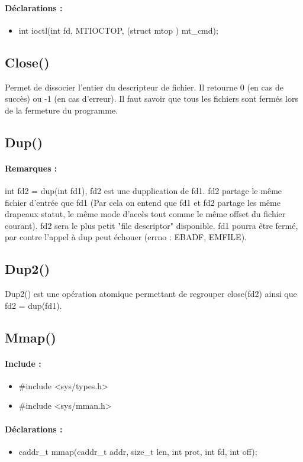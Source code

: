 \documentclass{article}[12pt]
\begin{document}
\paragraph{Déclarations : }
\begin{itemize}
	\item int ioctl(int fd, MTIOCTOP, (struct mtop \*) mt\_cmd);
\end{itemize}
\subsection{Close()}
Permet de dissocier l'entier du descripteur de fichier. Il retourne 0 (en cas de succès) ou -1 (en cas d'erreur). Il faut savoir que tous les fichiers sont fermés lors de la fermeture du programme.
\subsection{Dup()}
\paragraph{Remarques : } int fd2 = dup(int fd1), fd2 est une dupplication de fd1. fd2 partage le même fichier d'entrée que fd1 (Par cela on entend que fd1 et fd2 partage les même drapeaux statut, le même mode d'accès tout comme le même offset du fichier courant). fd2 sera le plus petit "file descriptor" disponible. fd1 pourra être fermé, par contre l'appel à dup peut échouer (errno : EBADF, EMFILE).
\subsection{Dup2()}
Dup2() est une opération atomique permettant de regrouper close(fd2) ainsi que fd2 = dup(fd1).
\subsection{Mmap()}
\paragraph{Include : }
\begin{itemize}
	\item \#include <sys/types.h>
	\item \#include <sys/mman.h>
\end{itemize}
\paragraph{Déclarations : }
\begin{itemize}
	\item caddr\_t mmap(caddr\_t addr, size\_t len, int prot, int fd, int off);
\end{itemize}
\end{document}
